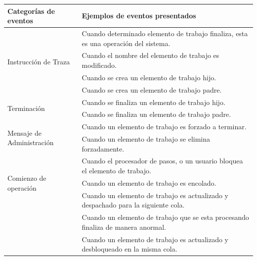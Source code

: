 \begin{table}
    \centering
    \begin{tabular}{l | p{10cm}}
        \toprule
            \textbf{Categorías de eventos} & \textbf{Ejemplos de eventos presentados} \\
        \toprule
            \multirow{4}{*}{Instrucción de Traza} 
                & \multicolumn{1}{p{10cm}}{Cuando determinado elemento de trabajo finaliza, esta es una operación del sistema.} \\
                \cmidrule{2-2}
                & Cuando el nombre del elemento de trabajo es modificado. \\ 
        \midrule
            \multirow{2}{*}{Creación} 
                & \multicolumn{1}{p{10cm}}{Cuando se crea un elemento de trabajo hijo.} \\
                \cmidrule{2-2}
                & Cuando se crea un elemento de trabajo padre. \\ 
        \midrule
            \multirow{2}{*}{Terminación} 
                & \multicolumn{1}{p{10cm}}{Cuando se finaliza un elemento de trabajo hijo.} \\
                \cmidrule{2-2}
                & Cuando se finaliza un elemento de trabajo padre. \\ 
        \midrule
            \multirow{2}{*}{Mensaje de Administración} 
                & \multicolumn{1}{p{10cm}}{Cuando un elemento de trabajo es forzado a terminar.} \\
                \cmidrule{2-2}
                & Cuando un elemento de trabajo se elimina forzadamente. \\ 
        \midrule
            \multirow{3}{*}{Comienzo de operación} 
                & \multicolumn{1}{p{10cm}}{Cuando el procesador de pasos, o un usuario bloquea el elemento de trabajo.} \\
                \cmidrule{2-2}
                & Cuando un elemento de trabajo es encolado. \\ 
        \midrule
            \multirow{12}{*}{Fin de operación} 
                & \multicolumn{1}{p{10cm}}{Cuando un elemento de trabajo es actualizado y despachado para la siguiente cola.} \\
                \cmidrule{2-2}
                & Cuando un elemento de trabajo que se esta procesando finaliza de manera anormal. \\ 
                \cmidrule{2-2}
                & Cuando un elemento de trabajo es actualizado y desbloqueado en la misma cola. \\ 

\end{tabular}
\end{table}
